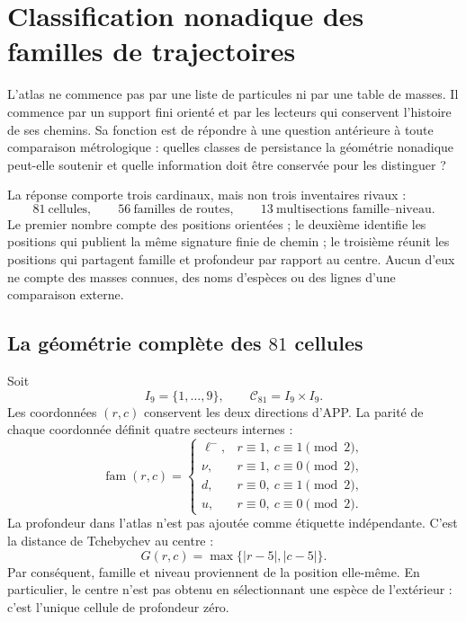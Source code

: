 \chapter[Classification nonadique des familles]{Classification nonadique des familles de trajectoires}
\label{chap:atlas-genealogia-masas}

L'atlas ne commence pas par une liste de particules ni par une table de masses.
Il commence par un support fini orienté et par les lecteurs qui conservent
l'histoire de ses chemins. Sa fonction est de répondre à une question antérieure à
toute comparaison métrologique : quelles classes de persistance la géométrie nonadique peut-elle
soutenir et quelle information doit être conservée pour les distinguer ?

La réponse comporte trois cardinaux, mais non trois inventaires rivaux :
\[
 81\ \text{cellules},\qquad
 56\ \text{familles de routes},\qquad
 13\ \text{multisections famille--niveau}.
\]
Le premier nombre compte des positions orientées ; le deuxième identifie les
positions qui publient la même signature finie de chemin ; le troisième réunit les
positions qui partagent famille et profondeur par rapport au centre. Aucun
d'eux ne compte des masses connues, des noms d'espèces ou des lignes d'une
comparaison externe.

\section{La géométrie complète des \(81\) cellules}

Soit
\[
 I_9=\{1,\ldots,9\},
 \qquad
 \mathcal C_{81}=I_9\times I_9.
\]
Les coordonnées \((r,c)\) conservent les deux directions d'APP\@. La parité
de chaque coordonnée définit quatre secteurs internes :
\[
 \operatorname{fam}(r,c)=
 \begin{cases}
  \ell^- ,& r\equiv1,\ c\equiv1\pmod2,\\
  \nu ,& r\equiv1,\ c\equiv0\pmod2,\\
  d ,& r\equiv0,\ c\equiv1\pmod2,\\
  u ,& r\equiv0,\ c\equiv0\pmod2.
 \end{cases}
 \tag{A1}\label{eq:familias-paridad-atlas}
\]
La profondeur dans l'atlas n'est pas ajoutée comme étiquette indépendante. C'est la
distance de Tchebychev au centre :
\[
 G(r,c)=\max\{|r-5|,|c-5|\}.
 \tag{A2}\label{eq:generacion-chebyshev-atlas}
\]
Par conséquent, famille et niveau proviennent de la position elle-même. En particulier,
le centre n'est pas obtenu en sélectionnant une espèce de l'extérieur : c'est l'unique
cellule de profondeur zéro.

